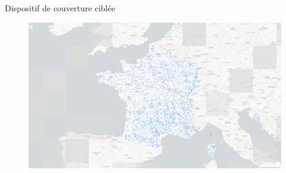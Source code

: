 \begin{frame}{Dispositif de couverture ciblée}
    \begin{figure}
        \includegraphics[height=.8\textheight]{images/couverture_ciblee.png}
    \end{figure}
\end{frame}